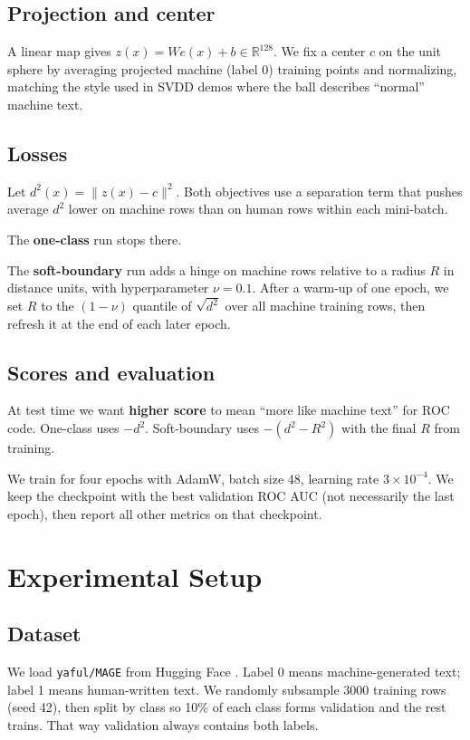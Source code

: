 \documentclass[11pt]{article}
\begin{document}
\subsection{Projection and center}
A linear map gives $z(x) = W e(x) + b \in \mathbb{R}^{128}$.
We fix a center $c$ on the unit sphere by averaging projected machine (label 0) training points and normalizing, matching the style used in SVDD demos where the ball describes ``normal'' machine text.

\subsection{Losses}
Let $d^2(x) = \| z(x) - c \|^2$.
Both objectives use a separation term that pushes average $d^2$ lower on machine rows than on human rows within each mini-batch.

The \textbf{one-class} run stops there.

The \textbf{soft-boundary} run adds a hinge on machine rows relative to a radius $R$ in distance units, with hyperparameter $\nu = 0.1$.
After a warm-up of one epoch, we set $R$ to the $(1-\nu)$ quantile of $\sqrt{d^2}$ over all machine training rows, then refresh it at the end of each later epoch.

\subsection{Scores and evaluation}
At test time we want \textbf{higher score} to mean ``more like machine text'' for ROC code.
One-class uses $-d^2$.
Soft-boundary uses $-(d^2 - R^2)$ with the final $R$ from training.

We train for four epochs with AdamW, batch size 48, learning rate $3 \times 10^{-4}$.
We keep the checkpoint with the best validation ROC AUC (not necessarily the last epoch), then report all other metrics on that checkpoint.

\section{Experimental Setup}
\subsection{Dataset}
We load \texttt{yaful/MAGE} from Hugging Face \citep{wang2023mage}.
Label 0 means machine-generated text; label 1 means human-written text.
We randomly subsample 3000 training rows (seed 42), then split by class so 10\% of each class forms validation and the rest trains.
That way validation always contains both labels.
\end{document}
